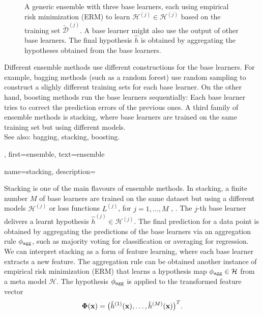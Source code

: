 {{{\begin{figure}[htbp]
\begin{center}
\begin{tikzpicture}
			\end{tikzpicture}
			\caption{A generic ensemble with three base learners, each  
				using empirical risk minimization (ERM) to learn $\mathcal{H}^{(j)} \in \mathcal{H}^{(j)}$ 
				based on the training set $\widetilde{\mathcal{D}}^{(j)}$. A base learner might also 
				use the output of other base learners. The final hypothesis $\hat{h}$ 
				is obtained by aggregating the hypotheses obtained from the base learners.}
		\end{center}
	\end{figure}
		Different ensemble methods use different constructions for the base learners. 
		For example, bagging methods (such as a random forest) use random sampling to 
		construct a slighly different training sets for each base learner. 
	    On the other hand, boosting methods run the base learners 
		sequentially: Each base learner tries to correct the prediction 
		errors of the previous ones. A third family of ensemble methods is stacking, 
		where base learners are trained on the same training set but using 
		different models.
		\\
	 	See also: bagging, stacking, boosting.},
	 first={ensemble},
	 text={ensemble} 
}

{name={stacking}, 
	description={Stacking is one of the main flavours of ensemble methods.  
		In stacking, a finite number $M$ of base learners are trained on the 
		same dataset but using a different models $\mathcal{H}^{(j)}$ 
		or loss functions $L^{(j)}$, for $j=1,\ldots,M$ \cite[Ch. 8.8]{hastie01statisticallearning},
		\cite{WOLPERT1992241,ZhouEnsemble2012}. 
		The $j$-th base learner delivers a learnt hypothesis 
		$\widehat{h}^{(j)} \in \mathcal{H}^{(j)}$. 
		The final prediction for a data point is obtained by aggregating the 
		predictions of the base learners via an aggregation rule $\phi_{\rm agg}$, 
		such as majority voting for classification or averaging for regression. 
		We can interpret stacking as a form of feature learning, where each base learner 
		extracts a new feature. The aggregation rule can be obtained another instance 
		of empirical risk minimization (ERM) that learns a hypothesis map $\phi_{\rm agg} \in \mathcal{H}$ from 
		a meta model $\mathcal{H}$. The hypothesis $\phi_{\rm agg}$ is applied to the 
		transformed feature vector $${\bf \Phi}({\bf x})= \big( \hat{h}^{(1)}({\bf x}), 
       \ldots, \hat{h}^{(M)}({\bf x}) \big)^{T}.$$
       \begin{figure}[htbp]
		\begin{center}
		\begin{tikzpicture}[
		font=\small,
		scale=1.0, transform shape,
		node distance=7mm and 10mm,
		dataset/.style={draw, rounded corners, inner sep=2pt},
		learner/.style={draw, rounded corners, minimum width=14mm, minimum height=7mm, inner sep=6pt,align=center},
		op/.style={draw, circle, inner sep=1pt},
		>=latex
		]
		

\end{tikzpicture}
\end{center}
\end{figure}}}}
